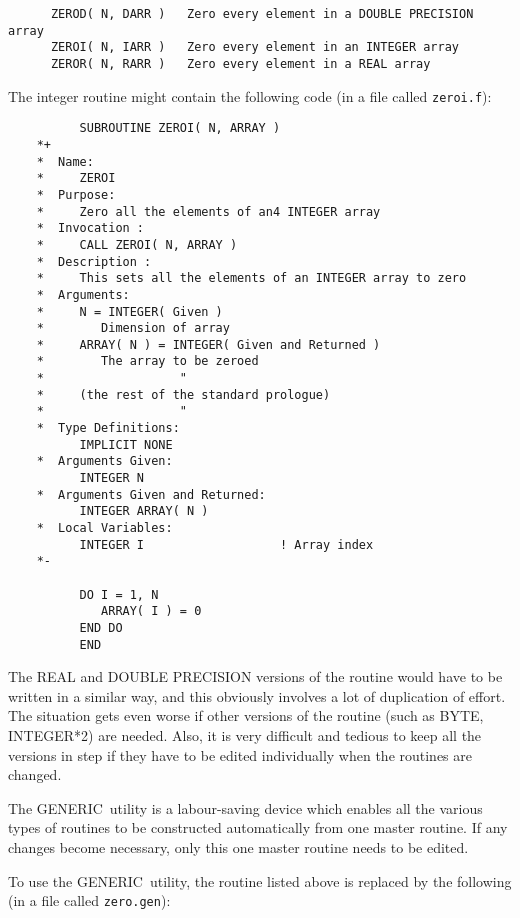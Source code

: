 \documentclass[twoside,11pt]{article}
\renewcommand{\_}{{\tt\char'137}}     %
\newcommand{\GENERIC}{{\footnotesize GENERIC}\normalsize}
\begin{document}
\begin{verbatim}
      ZEROD( N, DARR )   Zero every element in a DOUBLE PRECISION array
      ZEROI( N, IARR )   Zero every element in an INTEGER array
      ZEROR( N, RARR )   Zero every element in a REAL array
\end{verbatim}

The integer routine might contain the following code (in a file
called {\tt zeroi.f}):

\begin{verbatim}
          SUBROUTINE ZEROI( N, ARRAY )
    *+
    *  Name:
    *     ZEROI
    *  Purpose:
    *     Zero all the elements of an4 INTEGER array
    *  Invocation :
    *     CALL ZEROI( N, ARRAY )
    *  Description :
    *     This sets all the elements of an INTEGER array to zero
    *  Arguments:
    *     N = INTEGER( Given )
    *        Dimension of array
    *     ARRAY( N ) = INTEGER( Given and Returned )
    *        The array to be zeroed
    *                   "
    *     (the rest of the standard prologue)
    *                   "
    *  Type Definitions:
          IMPLICIT NONE
    *  Arguments Given:
          INTEGER N
    *  Arguments Given and Returned:
          INTEGER ARRAY( N )
    *  Local Variables:
          INTEGER I                   ! Array index
    *-

          DO I = 1, N
             ARRAY( I ) = 0
          END DO
          END
\end{verbatim}

The REAL and DOUBLE PRECISION versions of the routine would have to be
written in a similar way, and this obviously involves a lot of
duplication of effort.
The situation gets even worse if other versions of the routine
(such as BYTE, INTEGER*2) are needed.
Also, it is very difficult and tedious to keep all the versions
in step if they have to be edited individually when the routines
are changed.

The \GENERIC\ utility is a labour-saving device which enables all the
various types of routines to be constructed automatically from
one master routine.
If any changes become necessary, only this one master routine needs
to be edited.

To use the \GENERIC\ utility, the routine listed above is replaced by
the following (in a file called {\tt zero.gen}):
\end{document}
